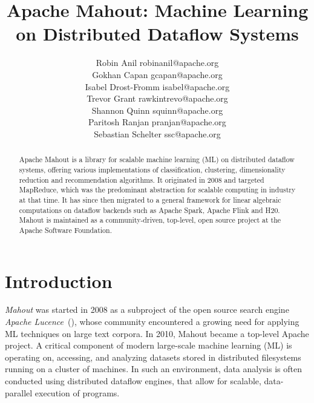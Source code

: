 \documentclass[twoside,11pt]{article}
\begin{document}
\title{Apache Mahout: Machine Learning on Distributed Dataflow Systems}

\author{\name Robin Anil \email robinanil@apache.org\\
  \name Gokhan Capan \email gcapan@apache.org\\
  \name Isabel Drost-Fromm \email isabel@apache.org\\
  \name Trevor Grant \email rawkintrevo@apache.org\\
  \name Shannon Quinn \email squinn@apache.org\\
  \name Paritosh Ranjan \email pranjan@apache.org\\
  \name Sebastian Schelter \email ssc@apache.org\\
}

\editor{}

\maketitle

\begin{abstract}%
Apache Mahout is a library for scalable machine learning (ML) on distributed dataflow systems, offering various implementations of classification, clustering, dimensionality reduction and recommendation algorithms. It originated in 2008 and targeted MapReduce, which was the predominant abstraction for scalable computing in industry at that time. It has since then migrated to a general framework for linear algebraic computations on dataflow backends such as Apache Spark, Apache Flink and H20. Mahout is maintained as a community-driven, top-level, open source project at the Apache Software Foundation. 
\end{abstract}


\section{Introduction}

\textit{Mahout} was started in 2008 as a subproject of the open source search engine \textit{Apache Lucence}~(\cite{Owen2012,Mccandless2010}), whose community encountered a growing need for applying ML techniques on large text corpora. In 2010, Mahout became a top-level Apache project. A critical component of modern large-scale machine learning (ML) is operating on, accessing, and analyzing datasets stored in distributed filesystems running on a cluster of machines. In such an environment, data analysis is often conducted using distributed dataflow engines, that allow for scalable, data-parallel execution of programs.
\end{document}
